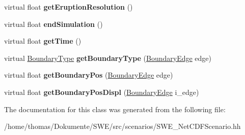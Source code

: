 \begin{DoxyCompactItemize}
\item 
\hypertarget{classSWE__NetCDFScenario_a3ac1462713e87d6c56d143c8162b0e5a}{virtual float {\bfseries get\-Eruption\-Resolution} ()}\label{classSWE__NetCDFScenario_a3ac1462713e87d6c56d143c8162b0e5a}

\item 
\hypertarget{classSWE__NetCDFScenario_a50652f7692d9484c4282ea1259a38ff6}{virtual float {\bfseries end\-Simulation} ()}\label{classSWE__NetCDFScenario_a50652f7692d9484c4282ea1259a38ff6}

\item 
\hypertarget{classSWE__NetCDFScenario_afac2bf584e48a55b6b0b3934c920589d}{virtual float {\bfseries get\-Time} ()}\label{classSWE__NetCDFScenario_afac2bf584e48a55b6b0b3934c920589d}

\item 
\hypertarget{classSWE__NetCDFScenario_a90c571b1fe32ca1506d8c01004013636}{virtual \hyperlink{SWE__Scenario_8hh_af75d5dd7322fa39ed0af4e7839e600f8}{Boundary\-Type} {\bfseries get\-Boundary\-Type} (\hyperlink{SWE__Scenario_8hh_aa5e01e3f7df312f7b9b0d02521141fcc}{Boundary\-Edge} edge)}\label{classSWE__NetCDFScenario_a90c571b1fe32ca1506d8c01004013636}

\item 
\hypertarget{classSWE__NetCDFScenario_a3a12dcd12b0bc53f24b244bdb7b98744}{virtual float {\bfseries get\-Boundary\-Pos} (\hyperlink{SWE__Scenario_8hh_aa5e01e3f7df312f7b9b0d02521141fcc}{Boundary\-Edge} edge)}\label{classSWE__NetCDFScenario_a3a12dcd12b0bc53f24b244bdb7b98744}

\item 
\hypertarget{classSWE__NetCDFScenario_a13588471a8370accdb29f19f6546456d}{virtual float {\bfseries get\-Boundary\-Pos\-Displ} (\hyperlink{SWE__Scenario_8hh_aa5e01e3f7df312f7b9b0d02521141fcc}{Boundary\-Edge} i\-\_\-edge)}\label{classSWE__NetCDFScenario_a13588471a8370accdb29f19f6546456d}

\end{DoxyCompactItemize}


The documentation for this class was generated from the following file\-:\begin{DoxyCompactItemize}
\item 
/home/thomas/\-Dokumente/\-S\-W\-E/src/scenarios/S\-W\-E\-\_\-\-Net\-C\-D\-F\-Scenario.\-hh\end{DoxyCompactItemize}
